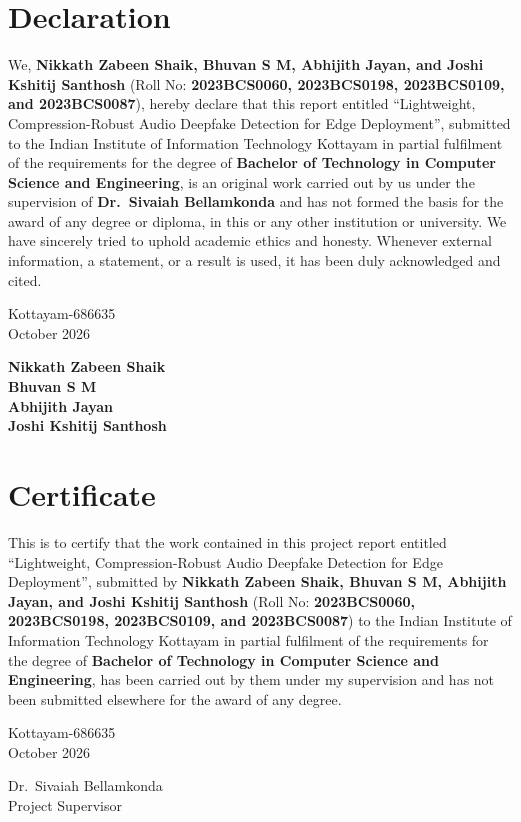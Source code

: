 \documentclass[12pt,a4paper]{report}
\newcommand{\StudentNames}{Nikkath Zabeen Shaik, Bhuvan S M, Abhijith Jayan, and Joshi Kshitij Santhosh}
\newcommand{\StudentRolls}{2023BCS0060, 2023BCS0198, 2023BCS0109, and 2023BCS0087}
\newcommand{\SupervisorName}{Dr.\ Sivaiah Bellamkonda}
\newcommand{\ProjectTitle}{Lightweight, Compression-Robust Audio Deepfake Detection for Edge Deployment}
\newcommand{\DepartmentName}{Computer Science and Engineering}
\newcommand{\SubmissionDate}{October 2026}
\begin{document}
\chapter*{Declaration}
\noindent
We, \textbf{\StudentNames} (Roll No: \textbf{\StudentRolls}), hereby declare that this report entitled ``\ProjectTitle'', submitted to the Indian Institute of Information Technology Kottayam in partial fulfilment of the requirements for the degree of \textbf{Bachelor of Technology in \DepartmentName}, is an original work carried out by us under the supervision of \textbf{\SupervisorName} and has not formed the basis for the award of any degree or diploma, in this or any other institution or university. We have sincerely tried to uphold academic ethics and honesty. Whenever external information, a statement, or a result is used, it has been duly acknowledged and cited.

\vspace{2cm}
\noindent
\begin{minipage}[t]{0.52\textwidth}
Kottayam-686635\\
\SubmissionDate
\end{minipage}%
\hfill
\begin{minipage}[t]{0.45\textwidth}
\raggedleft
\textbf{Nikkath Zabeen Shaik}\\
\textbf{Bhuvan S M}\\
\textbf{Abhijith Jayan}\\
\textbf{Joshi Kshitij Santhosh}
\end{minipage}

\clearpage
\chapter*{Certificate}
\noindent
This is to certify that the work contained in this project report entitled ``\ProjectTitle'', submitted by \textbf{\StudentNames} (Roll No: \textbf{\StudentRolls}) to the Indian Institute of Information Technology Kottayam in partial fulfilment of the requirements for the degree of \textbf{Bachelor of Technology in \DepartmentName}, has been carried out by them under my supervision and has not been submitted elsewhere for the award of any degree.

\vspace{2cm}
\noindent
\begin{minipage}[t]{0.52\textwidth}
Kottayam-686635\\
\SubmissionDate
\end{minipage}%
\hfill
\begin{minipage}[t]{0.45\textwidth}
\raggedleft
\SupervisorName\\
Project Supervisor
\end{minipage}
\end{document}
